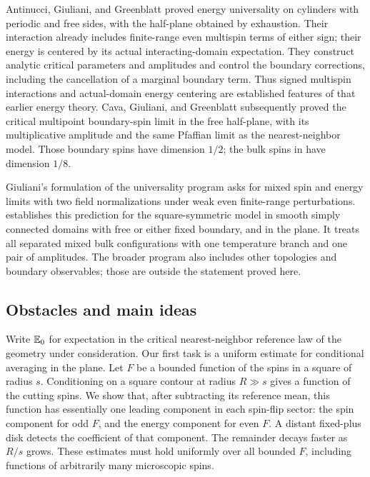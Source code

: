 Antinucci, Giuliani, and Greenblatt \cite[Theorem~1.1 and Corollary~1.2]{AGG2023} proved energy
universality on cylinders with periodic and free sides, with the
half-plane obtained by exhaustion. Their interaction already includes
finite-range even multispin terms of either sign; their energy is
centered by its actual interacting-domain expectation. They construct
analytic critical parameters and amplitudes and control the boundary
corrections, including the cancellation of a marginal boundary term.
Thus signed multispin interactions and actual-domain energy centering
are established features of that earlier energy theory. Cava,
Giuliani, and Greenblatt \cite[Theorem~1.1]{CGG2025} subsequently proved the
critical multipoint boundary-spin limit in the free half-plane, with
its multiplicative amplitude and the same Pfaffian limit as the
nearest-neighbor model.
Those boundary spins have dimension $1/2$; the bulk spins in
 have dimension $1/8$.

Giuliani's formulation of the universality program
\cite[Section~2 and Open Problems~1--2]{GiulianiICM2022} asks for
mixed spin and energy limits with two field normalizations under weak
even finite-range perturbations.  establishes this
prediction for the square-symmetric model in smooth simply connected
domains with free or either fixed boundary, and in the plane. It treats
all separated mixed bulk configurations with one temperature branch
and one pair of amplitudes. The broader program also includes other
topologies and boundary observables; those are outside the statement
proved here.

\subsection{Obstacles and main ideas}

Write $\mathbb E_0$ for expectation in the critical nearest-neighbor reference
law of the geometry under consideration. Our first task is a uniform
estimate for conditional averaging in the plane. Let $F$ be a bounded function
of the spins in a square of radius $s$. Conditioning on a square contour
at radius $R\gg s$ gives a function of the cutting spins. We show that,
after subtracting its reference mean, this function has essentially one
leading component in each spin-flip sector: the spin component for odd
$F$, and the energy component for even $F$. A distant fixed-plus disk
detects the coefficient of that component. The remainder decays faster
as $R/s$ grows. These estimates must hold uniformly over all bounded
$F$, including functions of arbitrarily many microscopic spins.

